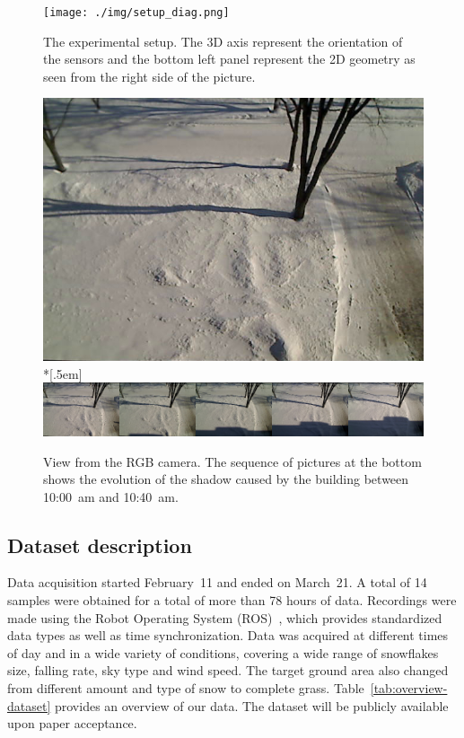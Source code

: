 \begin{figure}[th]
    \centering
    \texttt{[image: ./img/setup\_diag.png]}
    \caption{The experimental setup. The 3D axis represent the orientation of the sensors and the bottom left panel represent the 2D geometry as seen from the right side of the picture.}
    \label{fig:setup}
\end{figure}

\begin{figure}[th]
    \centering
    \includegraphics[width=0.90\linewidth]{./img/camera_view.jpg}\\*[.5em]
    \includegraphics[width=0.90\linewidth]{./img/shadow2.png}
    \caption{View from the RGB camera. The sequence of pictures at the bottom shows the evolution of the shadow caused by the building between 10:00~am and 10:40~am.}
    \label{fig:view}
\end{figure}

\subsection{Dataset description} %
Data acquisition started February~11 and ended on March~21. A total of 14 samples were obtained for a total of more than 78 hours of data. Recordings were made using the Robot Operating System (ROS)~\cite{ROSWeb}, which provides standardized data types as well as time synchronization. Data was acquired at different times of day and in a wide variety of conditions, covering a wide range of snowflakes size, falling rate, sky type and wind speed. The target ground area also changed from different amount and type of snow to complete grass. Table~\ref{tab:overview-dataset} provides an overview of our data. The dataset will be publicly available upon paper acceptance.

